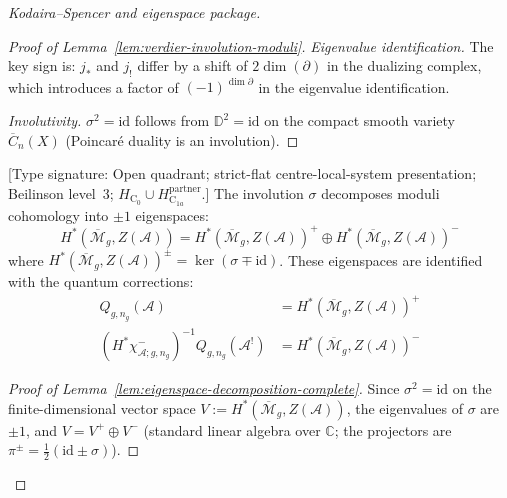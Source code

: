 \begin{proof}[Kodaira--Spencer and eigenspace package]
\begin{proof}[Proof of Lemma~\ref{lem:verdier-involution-moduli}]
\emph{Eigenvalue identification.}
The key sign is: $j_*$ and $j_!$ differ by a shift of $2\dim(\partial)$ in the
dualizing complex, which introduces a factor of $(-1)^{\dim \partial}$ in the
eigenvalue identification.

\emph{Involutivity.} $\sigma^2 = \mathrm{id}$ follows from
$\mathbb{D}^2 = \mathrm{id}$ on the compact smooth variety $\overline{C}_n(X)$
(Poincar\'e duality is an involution).
\end{proof}

\begin{lemma}
\label{lem:eigenspace-decomposition-complete}
\textup{[Type signature: Open quadrant; strict-flat
centre-local-system presentation; Beilinson level~3;
\(H_{\mathrm C_0}\cup H_{\mathrm C_{1a}}^{\mathrm{partner}}\).]}
The involution $\sigma$ decomposes moduli cohomology into $\pm 1$
eigenspaces:
\begin{equation}
H^*(\overline{\mathcal{M}}_g, Z(\mathcal{A})) =
H^*(\overline{\mathcal{M}}_g, Z(\mathcal{A}))^+ \oplus
H^*(\overline{\mathcal{M}}_g, Z(\mathcal{A}))^-
\end{equation}
where $H^*(\overline{\mathcal{M}}_g, Z(\mathcal{A}))^\pm = \ker(\sigma \mp
\mathrm{id})$. These eigenspaces are identified with the quantum corrections:
\begin{align}
Q_{g,n_g}(\mathcal{A}) &= H^*(\overline{\mathcal{M}}_g, Z(\mathcal{A}))^+\\
(H^*\chi^-_{\mathcal A;g,n_g})^{-1}Q_{g,n_g}(\mathcal{A}^!)
&= H^*(\overline{\mathcal{M}}_g, Z(\mathcal{A}))^-
\end{align}
\end{lemma}

\begin{proof}[Proof of Lemma~\ref{lem:eigenspace-decomposition-complete}]
Since $\sigma^2 = \mathrm{id}$ on the finite-dimensional vector space $V :=
H^*(\overline{\mathcal{M}}_g, Z(\mathcal{A}))$, the eigenvalues of $\sigma$ are
$\pm 1$, and $V = V^+ \oplus V^-$ (standard linear algebra over $\mathbb{C}$;
the projectors are $\pi^\pm = \frac{1}{2}(\mathrm{id} \pm \sigma)$).


\end{proof}
\end{proof}
